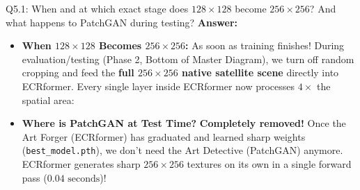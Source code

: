 \documentclass[11pt,a4paper]{article}
\begin{document}
\begin{qbox}{Q5.1: When and at which exact stage does $128\times 128$ become $256\times 256$? And what happens to PatchGAN during testing?}
\textbf{Answer:}
\begin{itemize}[leftmargin=18pt]
    \item \textbf{When $128\times 128$ Becomes $256\times 256$:} As soon as training finishes! During evaluation/testing (Phase 2, Bottom of Master Diagram), we turn off random cropping and feed the \textbf{full $256\times 256$ native satellite scene} directly into ECRformer. Every single layer inside ECRformer now processes $4\times$ the spatial area:
\end{itemize}

\begin{center}
\end{center}

\begin{itemize}[leftmargin=18pt]
    \item \textbf{Where is PatchGAN at Test Time?} \textbf{Completely removed!} Once the Art Forger (ECRformer) has graduated and learned sharp weights (\texttt{best\_model.pth}), we don't need the Art Detective (PatchGAN) anymore. ECRformer generates sharp $256\times 256$ textures on its own in a single forward pass ($0.04\text{ seconds}$)!
\end{itemize}
\end{qbox}
\end{document}
